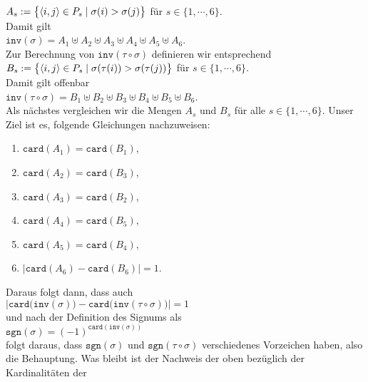 $A_s := \bigl\{ \pair(i,j) \in P_s \mid \sigma(i) > \sigma(j) \bigr\}$ \quad f\"ur $s \in \{1,\cdots,6\}$.
\\[0.2cm]
Damit gilt
\\[0.2cm]
\hspace*{1.3cm}
$\mathtt{inv}(\sigma) = A_1 \uplus A_2 \uplus A_3 \uplus A_4 \uplus A_5 \uplus A_6$. 
\\[0.2cm]
Zur Berechnung von $\mathtt{inv}(\tau \circ \sigma)$ definieren wir entsprechend 
\\[0.2cm]
\hspace*{1.3cm}
$B_s := \bigl\{ \pair(i,j) \in P_s \mid \sigma(\tau(i)) > \sigma(\tau(j)) \bigr\}$ \quad f\"ur $s \in \{1,\cdots,6\}$.
\\[0.2cm]
Damit gilt offenbar
\\[0.2cm]
\hspace*{1.3cm}
$\mathtt{inv}(\tau \circ \sigma) = B_1 \uplus B_2 \uplus B_3 \uplus B_4 \uplus B_5 \uplus B_6$. 
\\[0.2cm]
Als n\"achstes vergleichen wir die Mengen $A_s$ und $B_s$ f\"ur alle $s \in \{1,\cdots,6\}$.
Unser Ziel ist es, folgende Gleichungen nachzuweisen:
\begin{enumerate}
\item $\mathtt{card}(A_1) = \mathtt{card}(B_1)$,
\item $\mathtt{card}(A_2) = \mathtt{card}(B_3)$,
\item $\mathtt{card}(A_3) = \mathtt{card}(B_2)$,
\item $\mathtt{card}(A_4) = \mathtt{card}(B_5)$,
\item $\mathtt{card}(A_5) = \mathtt{card}(B_4)$,
\item $|\mathtt{card}(A_6) - \mathtt{card}(B_6)| = 1$.
\end{enumerate}
Daraus folgt dann, dass auch
\\[0.2cm]
\hspace*{1.3cm}
$\bigl|\mathtt{card}\bigl(\mathtt{inv}(\sigma)\bigr)-\mathtt{card}\bigl(\mathtt{inv}(\tau \circ \sigma)\bigr)\bigr| = 1$
\\[0.2cm]
und nach der Definition des Signums als 
\\[0.2cm]
\hspace*{1.3cm}
$\mathtt{sgn}(\sigma) = (-1)^{\mathtt{card}(\mathtt{inv}(\sigma))}$
\\[0.2cm]
folgt daraus, dass $\mathtt{sgn}(\sigma)$ und $\mathtt{sgn}(\tau \circ \sigma)$ verschiedenes Vorzeichen
haben, also die Behauptung.  Was bleibt ist der Nachweis der oben bez\"uglich der Kardinalit\"aten der
